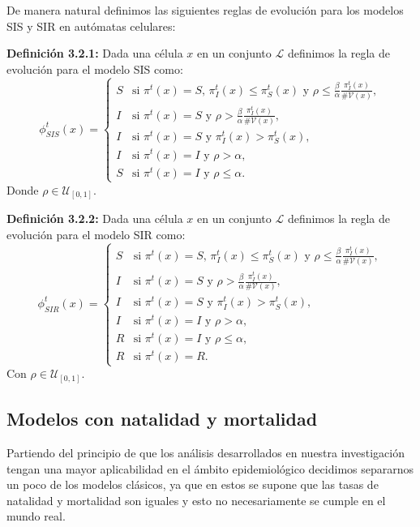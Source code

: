 De manera natural definimos las siguientes reglas de evolución para los modelos SIS y SIR en autómatas celulares:

\textbf{Definición 3.2.1:} Dada una célula $x$ en un conjunto $\mathcal{L}$ definimos la regla de evolución para el modelo SIS como:
\begin{equation}
    \phi_{SIS}^t(x)=\left\{\begin{array}{ll}
        S & \text{si }\pi^t(x)=S\text{, }\pi_I^t(x)\leq\pi_S^t(x)\text{ y }\rho\leq\frac{\beta}{\alpha}\frac{\pi_I^t(x)}{\#\mathcal{V}(x)}, \\
        I & \text{si }\pi^t(x)=S\text{ y }\rho>\frac{\beta}{\alpha}\frac{\pi_I^t(x)}{\#\mathcal{V}(x)}, \\
        I & \text{si }\pi^t(x)=S\text{ y }\pi_I^t(x)>\pi_S^t(x), \\
        I & \text{si }\pi^t(x)=I\text{ y }\rho>\alpha,\\
        S & \text{si }\pi^t(x)=I\text{ y }\rho\leq\alpha.
    \end{array}\right.
\end{equation}
Donde $\rho\in\mathcal{U}_{[0,1]}$.
    
\textbf{Definición 3.2.2:} Dada una célula $x$ en un conjunto $\mathcal{L}$ definimos la regla de evolución para el modelo SIR como:
\begin{equation}
    \phi_{SIR}^t(x)=\left\{\begin{array}{ll}
        S & \text{si }\pi^t(x)=S\text{, }\pi_I^t(x)\leq\pi_S^t(x)\text{ y }\rho\leq\frac{\beta}{\alpha}\frac{\pi_I^t(x)}{\#\mathcal{V}(x)}, \\
        I & \text{si }\pi^t(x)=S\text{ y }\rho>\frac{\beta}{\alpha}\frac{\pi_I^t(x)}{\#\mathcal{V}(x)}, \\
        I & \text{si }\pi^t(x)=S\text{ y }\pi_I^t(x)>\pi_S^t(x), \\
        I & \text{si }\pi^t(x)=I\text{ y }\rho>\alpha,\\
        R & \text{si }\pi^t(x)=I\text{ y }\rho\leq\alpha, \\
        R & \text{si }\pi^t(x)=R.
    \end{array}\right.
\end{equation}
Con $\rho\in\mathcal{U}_{[0,1]}$.
\subsection{Modelos con natalidad y mortalidad}
Partiendo del principio de que los análisis desarrollados en nuestra investigación tengan una mayor aplicabilidad en el ámbito epidemiológico decidimos separarnos un poco de los modelos clásicos, ya que en estos se supone que las tasas de natalidad y mortalidad son iguales y esto no necesariamente se cumple en el mundo real.

